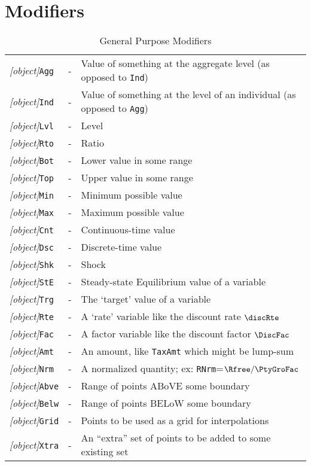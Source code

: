 \documentclass{econark}
\begin{document}
\section{Modifiers}
\begin{table}[ht]
  \centering
  \begin{tabular}{|>{\ttfamily}lcl|}
    \hline
    \textit{[object]}\texttt{Agg} & - & Value of something at the aggregate level (as opposed to \texttt{Ind})
    \\ \textit{[object]}\texttt{Ind} & - & Value of something at the level of an individual (as opposed to \texttt{Agg})
    \\ \textit{[object]}\texttt{Lvl} & - & Level
    \\ \textit{[object]}\texttt{Rto} & - & Ratio
    \\ \textit{[object]}\texttt{Bot} & - & Lower value in some range
    \\ \textit{[object]}\texttt{Top} & - & Upper value in some range
    \\ \textit{[object]}\texttt{Min} & - & Minimum possible value
    \\ \textit{[object]}\texttt{Max} & - & Maximum possible value
    \\ \textit{[object]}\texttt{Cnt} & - & Continuous-time value
    \\ \textit{[object]}\texttt{Dsc} & - & Discrete-time value
    \\ \textit{[object]}\texttt{Shk} & - & Shock
    \\ \textit{[object]}\texttt{StE} & - & Steady-state Equilibrium value of a variable
    \\ \textit{[object]}\texttt{Trg} & - & The `target' value of a variable
    \\ \textit{[object]}\texttt{Rte} & - & A `rate' variable like the discount rate $\discRte$
    \\ \textit{[object]}\texttt{Fac} & - & A factor variable like the discount factor $\DiscFac$
    \\ \textit{[object]}\texttt{Amt} & - & An amount, like \texttt{TaxAmt} which might be lump-sum
    \\ \textit{[object]}\texttt{Nrm} & - & A normalized quantity; ex: \texttt{RNrm}=$\Rfree/\PtyGroFac$
    \\ \textit{[object]}\texttt{Abve} & - & Range of points ABoVE some boundary
    \\ \textit{[object]}\texttt{Belw} & - & Range of points BELoW some boundary
    \\ \textit{[object]}\texttt{Grid} & - & Points to be used as a grid for interpolations
    \\ \textit{[object]}\texttt{Xtra} & - & An ``extra'' set of points to be added to some existing set \\ \hline
  \end{tabular}
  \caption{General Purpose Modifiers}
  \label{table:General}
\end{table}
\end{document}
